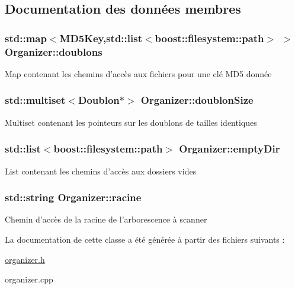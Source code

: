 \subsection{Documentation des données membres}
\hypertarget{class_organizer_aeeb5d47d3dc7eedccbfa4b25685e93a5}{
\subsubsection[{doublons}]{\setlength{\rightskip}{0pt plus 5cm}std\-::map$<${\bf M\-D5\-Key},std\-::list$<$boost\-::filesystem\-::path$>$ $>$ Organizer\-::doublons\hspace{0.3cm}{\ttfamily [protected]}}}\label{class_organizer_aeeb5d47d3dc7eedccbfa4b25685e93a5}
Map contenant les chemins d'accès aux fichiers pour une clé M\-D5 donnée \hypertarget{class_organizer_a05f940c569835259f6473fb762368e48}{
\subsubsection[{doublon\-Size}]{\setlength{\rightskip}{0pt plus 5cm}std\-::multiset$<${\bf Doublon}$\ast$$>$ Organizer\-::doublon\-Size\hspace{0.3cm}{\ttfamily [protected]}}}\label{class_organizer_a05f940c569835259f6473fb762368e48}
Multiset contenant les pointeurs sur les doublons de tailles identiques \hypertarget{class_organizer_a4b1b739d6b2ed1480f81022da9803c22}{
\subsubsection[{empty\-Dir}]{\setlength{\rightskip}{0pt plus 5cm}std\-::list$<$boost\-::filesystem\-::path$>$ Organizer\-::empty\-Dir\hspace{0.3cm}{\ttfamily [protected]}}}\label{class_organizer_a4b1b739d6b2ed1480f81022da9803c22}
List contenant les chemins d'accès aux dossiers vides \hypertarget{class_organizer_a2566fc607cc0b35100704973d863b9d2}{
\subsubsection[{racine}]{\setlength{\rightskip}{0pt plus 5cm}std\-::string Organizer\-::racine\hspace{0.3cm}{\ttfamily [protected]}}}\label{class_organizer_a2566fc607cc0b35100704973d863b9d2}
Chemin d'accès de la racine de l'arborescence à scanner 

La documentation de cette classe a été générée à partir des fichiers suivants \-:\begin{DoxyCompactItemize}
\item 
\hyperlink{organizer_8h}{organizer.\-h}\item 
organizer.\-cpp\end{DoxyCompactItemize}
